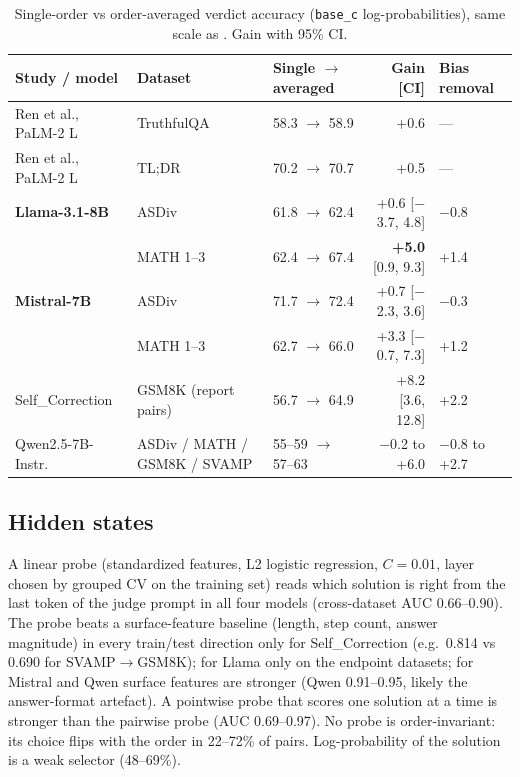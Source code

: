 \documentclass[11pt]{article}
\begin{document}
\begin{table}[t]
\centering\small
\caption{Single-order vs order-averaged verdict accuracy (\texttt{base\_c} log-probabilities), same scale as
\citet{ren2023selfeval}. Gain with 95\% CI.}
\label{tab:ren}
\begin{tabular}{lllrl}
\toprule
Study / model & Dataset & Single $\to$ averaged & Gain [CI] & Bias removal \\
\midrule
Ren et al., PaLM-2 L & TruthfulQA & 58.3 $\to$ 58.9 & +0.6 & --- \\
Ren et al., PaLM-2 L & TL;DR & 70.2 $\to$ 70.7 & +0.5 & --- \\
\textbf{Llama-3.1-8B} & ASDiv & 61.8 $\to$ 62.4 & +0.6 [$-$3.7, 4.8] & $-$0.8 \\
 & MATH 1--3 & 62.4 $\to$ 67.4 & \textbf{+5.0} [0.9, 9.3] & +1.4 \\
\textbf{Mistral-7B} & ASDiv & 71.7 $\to$ 72.4 & +0.7 [$-$2.3, 3.6] & $-$0.3 \\
 & MATH 1--3 & 62.7 $\to$ 66.0 & +3.3 [$-$0.7, 7.3] & +1.2 \\
Self\_Correction & GSM8K (report pairs) & 56.7 $\to$ 64.9 & +8.2 [3.6, 12.8] & +2.2 \\
Qwen2.5-7B-Instr. & ASDiv / MATH / GSM8K / SVAMP & 55--59 $\to$ 57--63 & $-$0.2 to +6.0 & $-$0.8 to +2.7 \\
\bottomrule
\end{tabular}
\end{table}

\subsection{Hidden states}
A linear probe (standardized features, L2 logistic regression, $C=0.01$, layer chosen by grouped CV on the
training set) reads which solution is right from the last token of the judge prompt in all four models
(cross-dataset AUC 0.66--0.90). The probe beats a surface-feature baseline (length, step count, answer
magnitude) in every train/test direction only for Self\_Correction (e.g.\ 0.814 vs 0.690 for SVAMP$\to$GSM8K);
for Llama only on the endpoint datasets; for Mistral and Qwen surface features are stronger (Qwen 0.91--0.95,
likely the answer-format artefact). A pointwise probe that scores one solution at a time is stronger than the
pairwise probe (AUC 0.69--0.97). No probe is order-invariant: its choice flips with the order in 22--72\% of
pairs. Log-probability of the solution is a weak selector (48--69\%).
\end{document}
